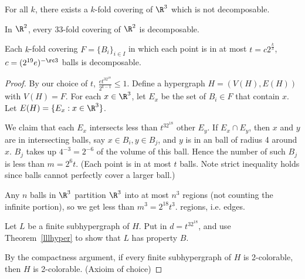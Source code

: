\begin{thm}
For all $k$, there exists a $k$-fold covering of $\R^3$ which is not decomposable.

In $\R^2$, every 33-fold covering of $\R^2$ is decomposable.
\end{thm}
\begin{thm}
Each $k$-fold covering $F=\{B_i\}_{i\in I}$ in which each point is in at most $t=c2^{\frac k3}$, $c=(2^{19}e)^{-\rc3}$ balls is decomposable.
\end{thm}
\begin{proof}
By our choice of $t$, $\frac{et^32^{18}}{2^{k-1}}\le 1$. Define a hypergraph $H=(V(H),E(H))$ with $V(H)=F$. For each $x\in \R^3$, let $E_x$ be the set of $B_i\in F$ that contain $x$. Let $E(H)=\{E_x:x\in \R^3\}$. %

We claim that each $E_x$ intersects less than $t^32^{18}$ other $E_y$. If $E_x\cap E_y$, then $x$ and $y$ are in intersecting balls, say $x\in B_i,y\in B_j$, and $y$ is in an ball of radius 4 around $x$. $B_j$ takes up $4^{-3}=2^{-6}$ of the volume of this ball. Hence the number of such $B_j$ is less than $m=2^6t$. (Each point is in at most $t$ balls. Note strict inequality holds since balls cannot perfectly cover a larger ball.)

Any $n$ balls in $\R^3$ partition $\R^3$ into at most $n^3$ regions (not counting the infinite portion), so we get less than $m^3=2^{18}t^3$.  regions, i.e. edges.

Let $L$ be a finite subhypergraph of $H$. %
Put in $d=t^32^{18}$, and use Theorem~\ref{lllhyper} to show that $L$ has property $B$.

By the compactness argument, if every finite subhypergraph of $H$ is 2-colorable, then $H$ is 2-colorable. (Axioim of choice)
\end{proof}
